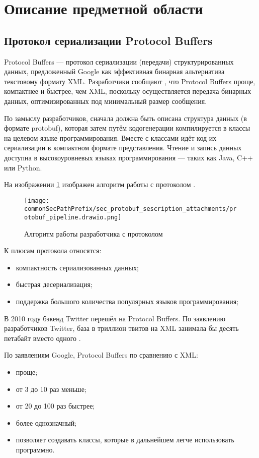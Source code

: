\section{Описание предметной области}

\subsection{Протокол сериализации Protocol Buffers}

Protocol Buffers --- протокол сериализации (передачи) структурированных данных, предложенный Google как эффективная бинарная альтернатива текстовому формату XML. Разработчики сообщают \cite{protobuf_doc}, что Protocol Buffers проще, компактнее и быстрее, чем XML, поскольку осуществляется передача бинарных данных, оптимизированных под минимальный размер сообщения.

По замыслу разработчиков, сначала должна быть описана структура данных (в формате protobuf), которая затем путём кодогенерации компилируется в классы на целевом языке программирования. Вместе с классами идёт код их сериализации в компактном формате представления. Чтение и запись данных доступна в высокоуровневых языках программирования --- таких как Java, C++ или Python.

На изображении \ref{fig:protobuf_algo} изображен алгоритм работы с протоколом \cite{protobuf_doc}.
\begin{figure}[ht]
    \centering
    \texttt{[image: \\commonSecPathPrefix/sec\_protobuf\_sescription\_attachments/protobuf\_pipeline.drawio.png]}
    \caption{Алгоритм работы разработчика с протоколом}
    \label{fig:protobuf_algo}
\end{figure}

К плюсам протокола относятся:

\begin{itemize}
    \item компактность сериализованных данных;
    \item быстрая десериализация;
    \item поддержка большого количества популярных языков программирования;
\end{itemize}

В 2010 году бэкенд Twitter перешёл на Protocol Buffers. По заявлению разработчиков Twitter, база в триллион твитов на XML занимала бы десять петабайт вместо одного \cite{protobuf_twitter}.

По заявлениям Google, Protocol Buffers по сравнению с XML:
\begin{itemize}
    \item проще;
    \item от 3 до 10 раз меньше;
    \item от 20 до 100 раз быстрее;
    \item более однозначный;
    \item позволяет создавать классы, которые в дальнейшем легче использовать программно.
\end{itemize}

